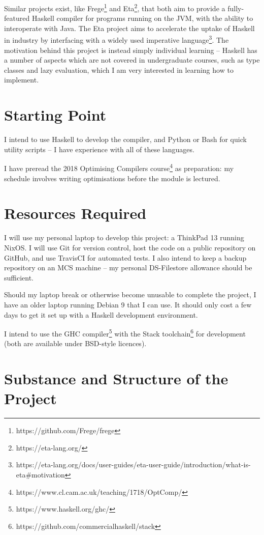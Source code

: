 \documentclass[12pt]{article}
\begin{document}
Similar projects exist, like Frege\footnote{https://github.com/Frege/frege} and Eta\footnote{https://eta-lang.org/},
that both aim to provide a fully-featured Haskell compiler for programs running on the JVM, with the ability to
interoperate with Java. The Eta project aims to accelerate the uptake of Haskell in industry by interfacing with a
widely used imperative
language\footnote{https://eta-lang.org/docs/user-guides/eta-user-guide/introduction/what-is-eta\#motivation}. The
motivation behind this project is instead simply individual learning -- Haskell has a number of aspects which are not
covered in undergraduate courses, such as type classes and lazy evaluation, which I am very interested in learning how
to implement.


\section*{Starting Point}

I intend to use Haskell to develop the compiler, and Python or Bash for quick utility scripts -- I have experience with
all of these languages.
 
I have preread the 2018 Optimising Compilers course\footnote{https://www.cl.cam.ac.uk/teaching/1718/OptComp/} as
preparation: my schedule involves writing optimisations before the module is lectured.


\section*{Resources Required}

I will use my personal laptop to develop this project: a ThinkPad 13 running NixOS. I will use Git for version control,
host the code on a public repository on GitHub, and use TravisCI for automated tests. I also intend to keep a backup
repository on an MCS machine -- my personal DS-Filestore allowance should be sufficient.

Should my laptop break or otherwise become unusable to complete the project, I have an older laptop running Debian 9
that I can use. It should only cost a few days to get it set up with a Haskell development environment.

I intend to use the GHC compiler\footnote{https://www.haskell.org/ghc/} with the Stack
toolchain\footnote{https://github.com/commercialhaskell/stack} for development (both are available under BSD-style
licences).


\section*{Substance and Structure of the Project}
\end{document}

